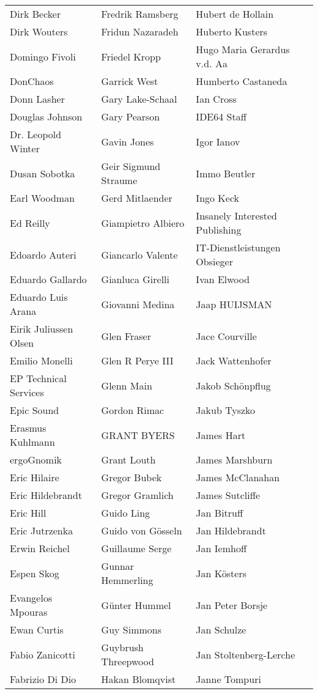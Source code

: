 \begin{small}
\begin{tabular}{p{4cm}p{4cm}p{4cm}}
Dirk Becker & Fredrik Ramsberg & Hubert de Hollain \\
Dirk Wouters & Fridun Nazaradeh & Huberto Kusters \\
Domingo Fivoli & Friedel Kropp & Hugo Maria Gerardus v.d. Aa \\
DonChaos & Garrick West & Humberto Castaneda \\
Donn Lasher & Gary Lake-Schaal & Ian Cross \\
Douglas Johnson & Gary Pearson & IDE64 Staff \\
Dr. Leopold Winter & Gavin Jones & Igor Ianov \\
Dusan Sobotka & Geir Sigmund Straume & Immo Beutler \\
Earl Woodman & Gerd Mitlaender & Ingo Keck \\
Ed Reilly & Giampietro Albiero & Insanely Interested Publishing \\
Edoardo Auteri & Giancarlo Valente & IT-Dienstleistungen Obsieger \\
Eduardo Gallardo & Gianluca Girelli & Ivan Elwood \\
Eduardo Luis Arana & Giovanni Medina & Jaap HUIJSMAN \\
Eirik Juliussen Olsen & Glen Fraser & Jace Courville \\
Emilio Monelli & Glen R Perye III & Jack Wattenhofer \\
EP Technical Services & Glenn Main & Jakob Schönpflug \\
Epic Sound & Gordon Rimac & Jakub Tyszko \\
Erasmus Kuhlmann & GRANT BYERS & James Hart \\
ergoGnomik & Grant Louth & James Marshburn \\
Eric Hilaire & Gregor Bubek & James McClanahan \\
Eric Hildebrandt & Gregor Gramlich & James Sutcliffe \\
Eric Hill & Guido Ling & Jan Bitruff \\
Eric Jutrzenka & Guido von Gösseln & Jan Hildebrandt \\
Erwin Reichel & Guillaume Serge & Jan Iemhoff \\
Espen Skog & Gunnar Hemmerling & Jan Kösters \\
Evangelos Mpouras & Günter Hummel & Jan Peter Borsje \\
Ewan Curtis & Guy Simmons & Jan Schulze \\
Fabio Zanicotti & Guybrush Threepwood & Jan Stoltenberg-Lerche \\
Fabrizio Di Dio & Hakan Blomqvist & Janne Tompuri \\

\end{tabular}
\end{small}
